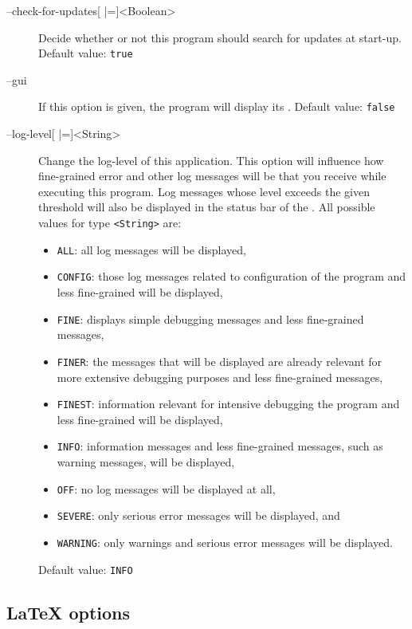 \begin{description}
\item[--check-for-updates{[} |={]}<Boolean>]
  Decide whether or not this program should search for updates
  at start-up.
  Default value: \texttt{true}

\item[--gui] If this option is given, the program will display its \GUI.
  Default value: \texttt{false}

\item[--log-level{[} |={]}<String>]
  Change the log-level of this application. This option will influence how
  fine-grained error and other log messages will be that you receive while
  executing this program.
  Log messages whose level exceeds the given threshold will also be displayed in the status bar of the \GUI.
  All possible values for type \texttt{<String>} are:
  \begin{itemize}
  \item \texttt{ALL}: all log messages will be displayed,
  \item \texttt{CONFIG}: those log messages related to configuration of the program and less fine-grained will be displayed,
  \item \texttt{FINE}:  displays simple debugging messages and less fine-grained messages,
  \item \texttt{FINER}: the messages that will be displayed are already relevant for more extensive debugging purposes and less fine-grained messages,
  \item \texttt{FINEST}: information relevant for intensive debugging the program and less fine-grained will be displayed,
  \item \texttt{INFO}: information messages and less fine-grained messages, such as warning messages, will be displayed,
  \item \texttt{OFF}: no log messages will be displayed at all,
  \item \texttt{SEVERE}: only serious error messages will be displayed, and
  \item \texttt{WARNING}: only warnings and serious error messages will be displayed.
  \end{itemize}
  Default value: \texttt{INFO}
\end{description}

\subsection{\LaTeX{} options}
\label{sec:LaTeX_Options}

